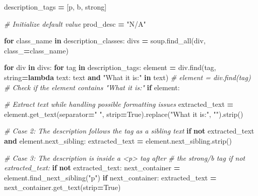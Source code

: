 \documentclass[
]{article}
\newenvironment{Shaded}{\begin{snugshade}}{\end{snugshade}}
\newcommand{\CommentTok}[1]{\textcolor[rgb]{0.56,0.35,0.01}{\textit{#1}}}
\newcommand{\ControlFlowTok}[1]{\textcolor[rgb]{0.13,0.29,0.53}{\textbf{#1}}}
\newcommand{\KeywordTok}[1]{\textcolor[rgb]{0.13,0.29,0.53}{\textbf{#1}}}
\newcommand{\NormalTok}[1]{#1}
\newcommand{\OperatorTok}[1]{\textcolor[rgb]{0.81,0.36,0.00}{\textbf{#1}}}
\newcommand{\StringTok}[1]{\textcolor[rgb]{0.31,0.60,0.02}{#1}}
\newcommand{\VariableTok}[1]{\textcolor[rgb]{0.00,0.00,0.00}{#1}}
\begin{document}
\begin{Shaded}
\begin{Highlighting}[]
\NormalTok{        description\_tags }\OperatorTok{=}\NormalTok{ [}\StringTok{\textquotesingle{}p\textquotesingle{}}\NormalTok{, }\StringTok{\textquotesingle{}b\textquotesingle{}}\NormalTok{, }\StringTok{\textquotesingle{}strong\textquotesingle{}}\NormalTok{]}

        \CommentTok{\# Initialize default value}
\NormalTok{        prod\_desc }\OperatorTok{=} \StringTok{"N/A"}

        \ControlFlowTok{for}\NormalTok{ class\_name }\KeywordTok{in}\NormalTok{ description\_classes:}
\NormalTok{          divs }\OperatorTok{=}\NormalTok{ soup.find\_all(}\StringTok{\textquotesingle{}div\textquotesingle{}}\NormalTok{, class\_}\OperatorTok{=}\NormalTok{class\_name)}

          \ControlFlowTok{for}\NormalTok{ div }\KeywordTok{in}\NormalTok{ divs:}
            \ControlFlowTok{for}\NormalTok{ tag }\KeywordTok{in}\NormalTok{ description\_tags:}
\NormalTok{              element }\OperatorTok{=}\NormalTok{ div.find(tag, string}\OperatorTok{=}\KeywordTok{lambda}\NormalTok{ text: }
\NormalTok{                                  text }\KeywordTok{and} \StringTok{"What it is:"} \KeywordTok{in}\NormalTok{ text)}
              \CommentTok{\# element = div.find(tag)}
              \CommentTok{\# Check if the element contains "What it is:"}
              \ControlFlowTok{if}\NormalTok{ element: }

                \CommentTok{\# Extract text while handling possible formatting issues}
\NormalTok{                extracted\_text }\OperatorTok{=}\NormalTok{ element.get\_text(separator}\OperatorTok{=}\StringTok{" "}\NormalTok{, }
\NormalTok{                strip}\OperatorTok{=}\VariableTok{True}\NormalTok{).replace(}\StringTok{"What it is:"}\NormalTok{, }\StringTok{""}\NormalTok{).strip()}

                \CommentTok{\# Case 2: The description follows the tag as a sibling text}
                \ControlFlowTok{if} \KeywordTok{not}\NormalTok{ extracted\_text }\KeywordTok{and}\NormalTok{ element.next\_sibling:}
\NormalTok{                  extracted\_text }\OperatorTok{=}\NormalTok{ element.next\_sibling.strip()}
    
                \CommentTok{\# Case 3: The description is inside a \textasciigrave{}\textless{}p\textgreater{}\textasciigrave{} tag after }
                \CommentTok{\# the strong/b tag if not extracted\_text:}
                \ControlFlowTok{if} \KeywordTok{not}\NormalTok{ extracted\_text:}
\NormalTok{                  next\_container }\OperatorTok{=}\NormalTok{ element.find\_next\_sibling(}\StringTok{"p"}\NormalTok{)}
                  \ControlFlowTok{if}\NormalTok{ next\_container:}
\NormalTok{                    extracted\_text }\OperatorTok{=}\NormalTok{ next\_container.get\_text(strip}\OperatorTok{=}\VariableTok{True}\NormalTok{)}
                    

\end{Highlighting}
\end{Shaded}
\end{document}
